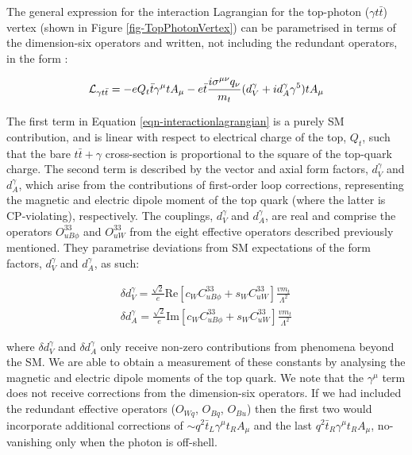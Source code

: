 The general expression for the interaction Lagrangian for the top-photon ($\gamma t \bar{t}$) vertex (shown in Figure \ref{fig-TopPhotonVertex}) can be parametrised in terms of the dimension-six operators and written, not including the redundant operators, in the form \cite{anom-coups}:

\begin{equation} \label{eqn-interactionlagrangian}
\mathcal{L}_{\gamma t\bar{t}} = -eQ_t\bar{t}\gamma^{\mu}tA_{\mu} - e\bar{t}\frac{i\sigma^{\mu\nu}q_{\nu}}{m_t}(d^{\gamma}_V+id^{\gamma}_A\gamma^5)tA_{\mu}
\end{equation}

The first term in Equation \ref{eqn-interactionlagrangian} is a purely SM contribution, and is linear with respect to electrical charge of the top, $Q_t$, such that the bare $t\bar{t}+\gamma$ cross-section is proportional to the square of the top-quark charge. The second term is described by the vector and axial form factors, $d^{\gamma}_V$ and $d^{\gamma}_A$, which arise from the contributions of first-order loop corrections, representing the magnetic and electric dipole moment of the top quark (where the latter is CP-violating), respectively. The couplings, $d^{\gamma}_V$ and $d^{\gamma}_A$, are real and comprise the operators $O^{33}_{uB\phi}$ and $O^{33}_{uW}$ from the eight effective operators described previously mentioned. They parametrise deviations from SM expectations of the form factors, $d^{\gamma}_V$ and $d^{\gamma}_A$, as such:

\begin{align}\label{eqn-smparameterisations}
\delta d^{\gamma}_V = \frac{\sqrt{2}}{e}\text{Re}[c_W C^{33}_{uB\phi} + s_W C^{33}_{uW}]\frac{vm_t}{\Lambda^2} \\
\delta d^{\gamma}_A = \frac{\sqrt{2}}{e}\text{Im}[c_W C^{33}_{uB\phi} + s_W C^{33}_{uW}]\frac{vm_t}{\Lambda^2}
\end{align}

where $\delta d^{\gamma}_V$ and $\delta d^{\gamma}_A$ only receive non-zero contributions from phenomena beyond the SM. We are able to obtain a measurement of these constants by analysing the magnetic and electric dipole moments of the top quark. We note that the $\gamma^{\mu}$ term does not receive corrections from the dimension-six operators. If we had included the redundant effective operators ($O_{Wq}$, $O_{Bq}$, $O_{Bu}$) then the first two would incorporate additional corrections of $\sim q^2 \bar{t}_L \gamma^{\mu} t_R A_{\mu}$ and the last $q^2 \bar{t}_R \gamma^{\mu} t_R A_{\mu}$, no-vanishing only when the photon is off-shell.


